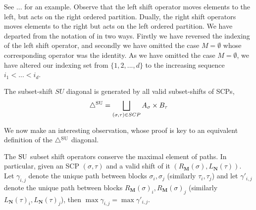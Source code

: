 See ... for an example.
Observe that the left shift operator moves elements to the left, but acts on the right ordered partition. Dually, the right shift operators moves elements to the right but acts on the left ordered partition. We have departed from the notation of \cite{saneblidzeComparingDiagonalsAssociahedra2022} in two ways. Firstly we have reversed the indexing of the left shift operator, and secondly we have omitted the case $M=\emptyset$ whose corresponding operator was the identity. As we have omitted the case $M=\emptyset$, we have altered our indexing set from $\{1,2,...,d\}$ to the increasing sequence $i_1<...<i_d$. 
\begin{proposition}
The subset-shift $SU$ diagonal is generated by all valid subset-shifts of SCPs,
\begin{align*}
    \triangle^{\mathrm{SU}} = \bigsqcup_{(\sigma,\tau) \in SCP} A_\sigma \times B_\tau
\end{align*}

\end{proposition}


We now make an interesting observation, whose proof is key to an equivalent definition of the $\triangle^{\mathrm{SU}}$ diagonal. 
\begin{lemma} \label{lem:SU subset conserves maximal element of paths}
The $\mathrm{SU}$ subset shift operators conserve the maximal element of paths. In particular, given an SCP $(\sigma,\tau)$ and a valid shift of it $(R_{\mathbf{M}}(\sigma),L_{\mathbf{N}}(\tau))$. Let $\gamma_{i,j}$ denote the unique path between blocks $\sigma_i,\sigma_j$ (similarly $\tau_i,\tau_j$) and let $\gamma'_{i,j}$ denote the unique path between blocks $R_{\mathbf{M}}(\sigma)_i,R_{\mathbf{M}}(\sigma)_j$ (similarly $L_{\mathbf{N}}(\tau)_i ,L_{\mathbf{N}}(\tau)_j$), then $\max \gamma_{i,j} = \max \gamma'_{i,j} $.
\end{lemma}

